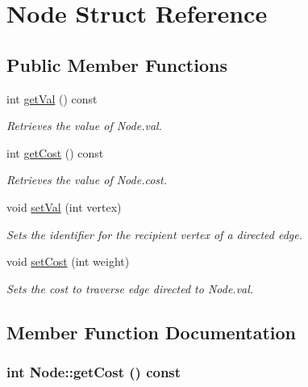 \hypertarget{structNode}{
\section{Node Struct Reference}
\label{structNode}
}
\subsection*{Public Member Functions}
\begin{DoxyCompactItemize}
\item 
int \hyperlink{structNode_a957988714d1379c48c42a78d28c3e76f}{getVal} () const 
\begin{DoxyCompactList}\small\item\em Retrieves the value of Node.val. \item\end{DoxyCompactList}\item 
int \hyperlink{structNode_a91e4e810ff0506963c534a09b7caaab3}{getCost} () const 
\begin{DoxyCompactList}\small\item\em Retrieves the value of Node.cost. \item\end{DoxyCompactList}\item 
void \hyperlink{structNode_ad2e319a35d03a16c1e8475025ebe3053}{setVal} (int vertex)
\begin{DoxyCompactList}\small\item\em Sets the identifier for the recipient vertex of a directed edge. \item\end{DoxyCompactList}\item 
void \hyperlink{structNode_ac529b9fd9288f957bfb130ec30eae8bf}{setCost} (int weight)
\begin{DoxyCompactList}\small\item\em Sets the cost to traverse edge directed to Node.val. \item\end{DoxyCompactList}\end{DoxyCompactItemize}


\subsection{Member Function Documentation}
\hypertarget{structNode_a91e4e810ff0506963c534a09b7caaab3}{
\subsubsection[{getCost}]{\setlength{\rightskip}{0pt plus 5cm}int Node::getCost () const}}
\label{structNode_a91e4e810ff0506963c534a09b7caaab3}


